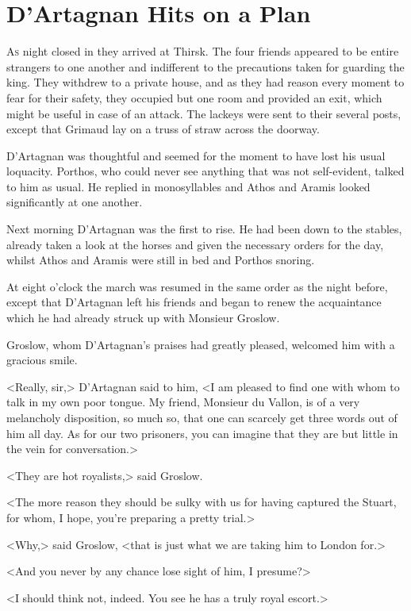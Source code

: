\chapter{D'Artagnan Hits on a Plan}

 \lettrine{A}{s} night closed in they arrived at Thirsk. The four friends appeared to be entire strangers to one another and indifferent to the precautions taken for guarding the king. They withdrew to a private house, and as they had reason every moment to fear for their safety, they occupied but one room and provided an exit, which might be useful in case of an attack. The lackeys were sent to their several posts, except that Grimaud lay on a truss of straw across the doorway.

D'Artagnan was thoughtful and seemed for the moment to have lost his usual loquacity. Porthos, who could never see anything that was not self-evident, talked to him as usual. He replied in monosyllables and Athos and Aramis looked significantly at one another.

Next morning D'Artagnan was the first to rise. He had been down to the stables, already taken a look at the horses and given the necessary orders for the day, whilst Athos and Aramis were still in bed and Porthos snoring.

At eight o'clock the march was resumed in the same order as the night before, except that D'Artagnan left his friends and began to renew the acquaintance which he had already struck up with Monsieur Groslow.

Groslow, whom D'Artagnan's praises had greatly pleased, welcomed him with a gracious smile.

<Really, sir,> D'Artagnan said to him, <I am pleased to find one with whom to talk in my own poor tongue. My friend, Monsieur du Vallon, is of a very melancholy disposition, so much so, that one can scarcely get three words out of him all day. As for our two prisoners, you can imagine that they are but little in the vein for conversation.>

<They are hot royalists,> said Groslow.

<The more reason they should be sulky with us for having captured the Stuart, for whom, I hope, you're preparing a pretty trial.>

<Why,> said Groslow, <that is just what we are taking him to London for.>

<And you never by any chance lose sight of him, I presume?>

<I should think not, indeed. You see he has a truly royal escort.>

